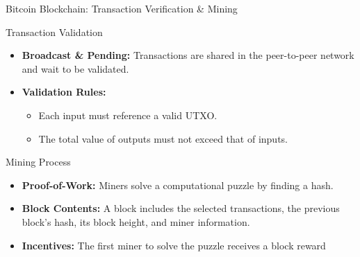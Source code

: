 \documentclass{beamer}
\begin{document}
\begin{frame}{Bitcoin Blockchain: Transaction Verification \& Mining}
    \footnotesize

    \begin{block}{Transaction Validation}
        \begin{itemize}
            \item \textbf{Broadcast \& Pending:} Transactions are shared in the peer-to-peer network and wait to be validated.
            \item \textbf{Validation Rules:}
                  \begin{itemize}
                      \item Each input must reference a valid UTXO.
                      \item The total value of outputs must not exceed that of inputs.
                  \end{itemize}
        \end{itemize}
    \end{block}

    \begin{block}{Mining Process}
        \begin{itemize}
            \item \textbf{Proof-of-Work:} Miners solve a computational puzzle by finding a hash.
            \item \textbf{Block Contents:} A block includes the selected transactions, the previous block's hash, its block height, and miner information.
            \item \textbf{Incentives:} The first miner to solve the puzzle receives a block reward
        \end{itemize}
    \end{block}

\end{frame}
\end{document}
